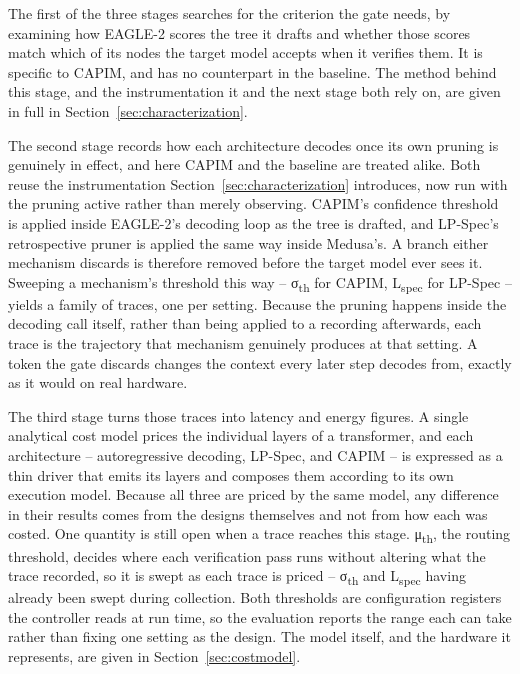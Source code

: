 \documentclass[11pt]{article}
\begin{document}
The first of the three stages searches for the criterion the gate needs, by examining how EAGLE-2 scores the tree it drafts and whether those scores match which of its nodes the target model accepts when it verifies them. It is specific to CAPIM, and has no counterpart in the baseline. The method behind this stage, and the instrumentation it and the next stage both rely on, are given in full in Section~\ref{sec:characterization}.

The second stage records how each architecture decodes once its own pruning is genuinely in effect, and here CAPIM and the baseline are treated alike. Both reuse the instrumentation Section~\ref{sec:characterization} introduces, now run with the pruning active rather than merely observing. CAPIM's confidence threshold is applied inside EAGLE-2's decoding loop as the tree is drafted, and LP-Spec's retrospective pruner is applied the same way inside Medusa's. A branch either mechanism discards is therefore removed before the target model ever sees it. Sweeping a mechanism's threshold this way -- σ\textsubscript{th} for CAPIM, L\textsubscript{spec} for LP-Spec -- yields a family of traces, one per setting. Because the pruning happens inside the decoding call itself, rather than being applied to a recording afterwards, each trace is the trajectory that mechanism genuinely produces at that setting. A token the gate discards changes the context every later step decodes from, exactly as it would on real hardware.

The third stage turns those traces into latency and energy figures. A single analytical cost model prices the individual layers of a transformer, and each architecture -- autoregressive decoding, LP-Spec, and CAPIM -- is expressed as a thin driver that emits its layers and composes them according to its own execution model. Because all three are priced by the same model, any difference in their results comes from the designs themselves and not from how each was costed. One quantity is still open when a trace reaches this stage. μ\textsubscript{th}, the routing threshold, decides where each verification pass runs without altering what the trace recorded, so it is swept as each trace is priced -- σ\textsubscript{th} and L\textsubscript{spec} having already been swept during collection. Both thresholds are configuration registers the controller reads at run time, so the evaluation reports the range each can take rather than fixing one setting as the design. The model itself, and the hardware it represents, are given in Section~\ref{sec:costmodel}.
\end{document}
